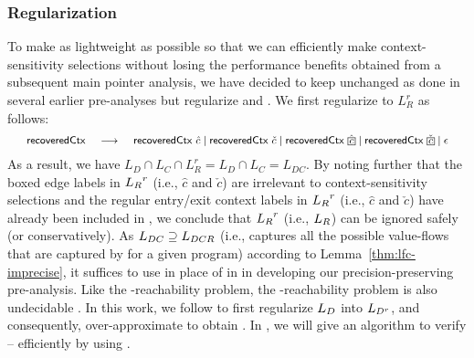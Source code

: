 \subsubsection{Regularization}
\label{subsec:regularization}
To make \tool as lightweight as possible so that we can efficiently make context-sensitivity selections without losing the performance benefits obtained from a subsequent main pointer analysis, we have decided to keep \LC unchanged
as done in several earlier pre-analyses \cite{lu2019precision, lu2021eagle, lu2021selective} but regularize \LF and \LR. We first regularize \LR to $L_R^r$ as follows:
\begin{equation}
\label{eqn:newLRr}
\footnotesize
\begin{tabular}{rcl}
$\recoveredctx$ & $\longrightarrow$ & $\recoveredctx~\hat{c} \mid \recoveredctx~\check{c} \mid \recoveredctx~\hat{\boxed{c}}\mid \recoveredctx ~ \check{\boxed{c}}\mid \epsilon$
\end{tabular}
\end{equation}
As a result, we have $L_D \cap L_C \cap L_R^r = L_D \cap L_C = L_{DC}$. By  noting
further  that the boxed edge labels in $\mbox{${L}_R$}^r$ (i.e.,
$\hat{\boxed{c}}$ and $\check{\boxed{c}}$)
are irrelevant to context-sensitivity selections and the regular entry/exit context labels in $\mbox{${L}_R$}^r$ (i.e., $\hat{c}$ and $\check{c}$) have already been included in 
\LC, we conclude that
 $\mbox{${L}_R$}^r$ (i.e., $\mbox{${L}_R$}$) can be ignored safely (or conservatively).
As $\mbox{${L}_{DC}$} \supseteq \mbox{${L}_{DCR}$}$ (i.e., \LFC  captures all the possible value-flows that are captured by
\LFCR for a given program) according to
Lemma~\ref{thm:lfc-imprecise}, it suffices to use \LFC in place of \manuLFC
in  in developing our precision-preserving pre-analysis. 
Like the \manuLFC-reachability problem, the \LFC-reachability problem is also
 undecidable \cite{reps2000undecidability}. In this work, we follow  \cite{lu2021selective} to first regularize $\mbox{${L}_D$}$ into $\mbox{${L}_{D^r}$}$, and consequently,
 over-approximate \LFC to obtain \capLGC. In
 , we will give an  algorithm to verify \selconOne -- \selconThree efficiently by using
 \LGC.
 


